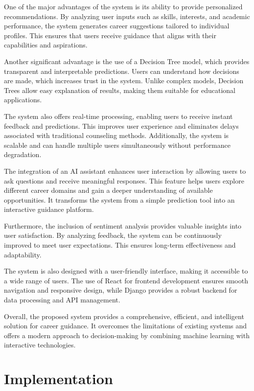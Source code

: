 \documentclass[12pt,a4paper]{report}
\begin{document}
{One of the major advantages of the system is its ability to provide personalized recommendations. By analyzing user inputs such as skills, interests, and academic performance, the system generates career suggestions tailored to individual profiles. This ensures that users receive guidance that aligns with their capabilities and aspirations.

Another significant advantage is the use of a Decision Tree model, which provides transparent and interpretable predictions. Users can understand how decisions are made, which increases trust in the system. Unlike complex models, Decision Trees allow easy explanation of results, making them suitable for educational applications.

The system also offers real-time processing, enabling users to receive instant feedback and predictions. This improves user experience and eliminates delays associated with traditional counseling methods. Additionally, the system is scalable and can handle multiple users simultaneously without performance degradation.

The integration of an AI assistant enhances user interaction by allowing users to ask questions and receive meaningful responses. This feature helps users explore different career domains and gain a deeper understanding of available opportunities. It transforms the system from a simple prediction tool into an interactive guidance platform.

Furthermore, the inclusion of sentiment analysis provides valuable insights into user satisfaction. By analyzing feedback, the system can be continuously improved to meet user expectations. This ensures long-term effectiveness and adaptability.

The system is also designed with a user-friendly interface, making it accessible to a wide range of users. The use of React for frontend development ensures smooth navigation and responsive design, while Django provides a robust backend for data processing and API management.

Overall, the proposed system provides a comprehensive, efficient, and intelligent solution for career guidance. It overcomes the limitations of existing systems and offers a modern approach to decision-making by combining machine learning with interactive technologies.

\clearpage
\setcounter{page}{34}

\chapter{Implementation}
\setlength{\parindent}{0pt}
\setlength{\parskip}{0.6em}
\justifying

}
\end{document}
